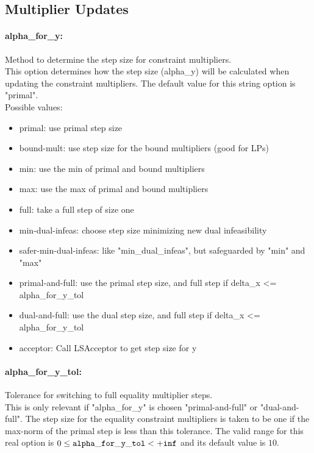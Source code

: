 \subsection{Multiplier Updates}

\paragraph{alpha\_for\_y:}\label{opt:alpha_for_y} Method to determine the step size for constraint multipliers. \\
 This option determines how the step size (alpha\_y) will be calculated when updating the constraint multipliers. The default value for this string option is "primal".
\\ 
Possible values:
\begin{itemize}
   \item primal: use primal step size
   \item bound-mult: use step size for the bound multipliers (good for LPs)
   \item min: use the min of primal and bound multipliers
   \item max: use the max of primal and bound multipliers
   \item full: take a full step of size one
   \item min-dual-infeas: choose step size minimizing new dual infeasibility
   \item safer-min-dual-infeas: like "min\_dual\_infeas", but safeguarded by "min" and "max"
   \item primal-and-full: use the primal step size, and full step if delta\_x <= alpha\_for\_y\_tol
   \item dual-and-full: use the dual step size, and full step if delta\_x <= alpha\_for\_y\_tol
   \item acceptor: Call LSAcceptor to get step size for y
\end{itemize}

\paragraph{alpha\_for\_y\_tol:}\label{opt:alpha_for_y_tol} Tolerance for switching to full equality multiplier steps. \\
 This is only relevant if "alpha\_for\_y" is chosen "primal-and-full" or "dual-and-full".  The step size for the equality constraint multipliers is taken to be one if the max-norm of the primal step is less than this tolerance. The valid range for this real option is 
$0 \le {\tt alpha\_for\_y\_tol } <  {\tt +inf}$
and its default value is $10$.


